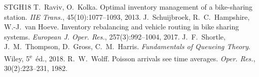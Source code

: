 \begin{thebibliography}{STGH18}
 T.~Raviv, O.~Kolka. Optimal inventory management of a bike-sharing station. \emph{IIE Trans.}, 45(10):1077--1093, 2013.
 J.~Schuijbroek, R.~C.~Hampshire, W.-J.~van Hoeve. Inventory rebalancing and vehicle routing in bike sharing systems. \emph{European J. Oper. Res.}, 257(3):992--1004, 2017.
 J.~F.~Shortle, J.~M.~Thompson, D.~Gross, C.~M.~Harris. \emph{Fundamentals of Queueing Theory}. Wiley, 5\textsuperscript{e}~éd., 2018.
 R.~W.~Wolff. Poisson arrivals see time averages. \emph{Oper. Res.}, 30(2):223--231, 1982.
\end{thebibliography}


